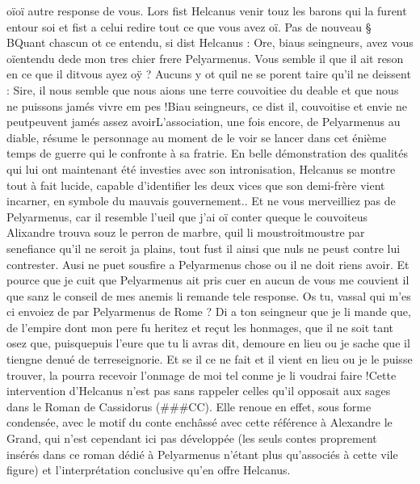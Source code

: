 \documentclass{article}
\begin{document}
\begin{pages}
      oïoï autre response de vous.
   Lors fist Helcanus venir touz les barons qui la furent entour soi et fist a celui redire 
   tout ce que vous avez oï. \pend
\pstart Pas de nouveau § BQuant chascun ot ce entendu, si dist 
   Helcanus :
   Ore, biaus seingneurs, avez vous oïentendu 
      dede mon tres chier frere Pelyarmenus. 
      Vous semble il que il ait reson en ce que il ditvous ayez oÿ ?
   Aucuns y ot quil ne se porent taire qu’il ne deissent :
   Sire, il nous semble que nous aions une terre couvoitiee du deable 
      et que nous ne puissons jamés vivre em pes !Biau seingneurs, ce dist il, couvoitise et envie ne 
      peutpeuvent jamés 
      assez avoirL'association, une fois encore, de Pelyarmenus au diable, résume le personnage 
         au moment de le voir se lancer dans cet énième temps de guerre qui le confronte à sa fratrie. En belle démonstration des 
         qualités qui lui ont maintenant été investies avec son intronisation, Helcanus se montre tout à fait lucide, capable d'identifier
         les deux vices que son demi-frère vient incarner, en symbole du mauvais gouvernement.. Et ne vous merveilliez pas de Pelyarmenus, car il resemble l’ueil que j’ai oï 
      conter queque le couvoiteus 
      Alixandre trouva souz le perron de marbre, quil li 
      moustroitmoustre par senefiance qu’il ne seroit ja plains, 
      tout fust il ainsi que nuls ne peust contre lui contrester. 
   Ausi ne puet sousfire a Pelyarmenus chose ou il ne doit riens avoir. 
   Et pource que je cuit que Pelyarmenus ait pris cuer en aucun de vous
      me couvient il que sanz le conseil de mes anemis li remande tele response. 
      Os tu, vassal qui m'es ci envoiez de par Pelyarmenus de 
      Rome ? Di a ton seingneur que je li mande que, 
   de l’empire dont mon pere fu heritez et reçut les honmages, 
      que il ne soit tant osez que, 
      puisquepuis l'eure que 
      tu li avras dit, 
      demoure en lieu ou je sache que il tiengne denué de terreseignorie. 
   Et se il ce ne fait et il vient en lieu ou je le puisse trouver, la pourra recevoir l’onmage de moi tel 
   conme je li voudrai faire !Cette intervention d'Helcanus n'est pas sans rappeler 
      celles qu'il opposait aux sages dans le Roman de Cassidorus (###CC). Elle renoue en effet, sous forme condensée, 
   avec le motif du conte enchâssé avec cette référence à Alexandre le Grand, qui n'est cependant ici pas développée (les seuls 
   contes proprement insérés dans ce roman dédié à Pelyarmenus n'étant plus qu'associés à cette vile figure) et l'interprétation 
   conclusive qu'en offre Helcanus. \pend

\end{pages}
\end{document}
